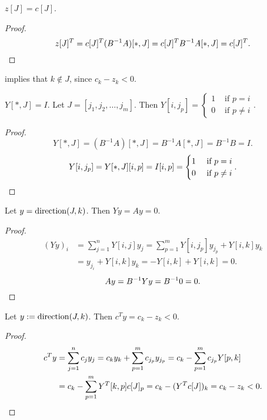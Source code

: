 \begin{lemma}
\label{thm:zJ-eq-cJ}
$z[J] = c[J]$.
\end{lemma}
\begin{proof}
\[ z[J]^T = c[J]^T(B^{-1}A)[*,J] = c[J]^TB^{-1}A[*,J] = c[J]^T.  \qedhere \]
\end{proof}
 implies that $k \not\in J$, since $c_k - z_k < 0$.

\begin{lemma}
\label{thm:YJ-is-I}
$Y[*, J] = I$.
Let $J = [j_1, j_2, \ldots, j_m]$.
Then $Y[i, j_p] = \begin{cases}1 & \textrm{ if } p = i
\\ 0 & \textrm{ if } p \neq i\end{cases}$.
\end{lemma}
\begin{proof}
\[ Y[*, J] = (B^{-1}A)[*, J] = B^{-1}A[*, J] = B^{-1}B = I. \]
\[ Y[i, j_p] = Y[*, J][i, p] = I[i, p] = \begin{cases}1 & \textrm{ if } p = i
\\ 0 & \textrm{ if } p \neq i\end{cases}. \qedhere \]
\end{proof}

\begin{lemma}
\label{thm:y-in-nullsp}
Let $y = \operatorname{direction}(J, k)$. Then $Yy = Ay = 0$.
\end{lemma}
\begin{proof}
\begin{align*}
(Yy)_i &= \sum_{j=1}^n Y[i, j]y_j
= \sum_{p=1}^m Y[i, j_p]y_{j_p} + Y[i, k]y_k
\\ &= y_{j_i} + Y[i, k]y_k
= -Y[i, k] + Y[i, k] = 0.
\end{align*}
\[ Ay = B^{-1}Yy = B^{-1}0 = 0. \qedhere \]
\end{proof}

\begin{lemma}
\label{thm:y-reduces-cost}
Let $y := \operatorname{direction}(J, k)$. Then $c^Ty = c_k - z_k < 0$.
\end{lemma}
\begin{proof}
\begin{align*}
c^Ty &= \sum_{j=1}^n c_jy_j = c_ky_k + \sum_{p=1}^m c_{j_p}y_{j_p}
= c_k - \sum_{p=1}^m c_{j_p}Y[p, k]
\\ &= c_k - \sum_{p=1}^m Y^T[k, p]c[J]_p
= c_k - (Y^Tc[J])_k = c_k - z_k < 0.
\qedhere \end{align*}
\end{proof}

